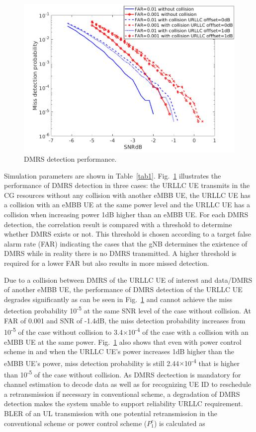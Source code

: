 \documentclass{report}
\begin{document}
\begin{figure}[htbp]
\centerline{\includegraphics[scale=0.33]{fig10.png}}
\caption{DMRS detection performance.}
\label{fig10}
\end{figure}

Simulation parameters are shown in Table~\ref{tab1}. Fig.~\ref{fig10} illustrates the performance of DMRS detection in three cases: the URLLC UE transmits in the CG resources without any collision with another eMBB UE, the URLLC UE has a collision with an eMBB UE at the same power level and the URLLC UE has a collision when increasing power 1dB higher than an eMBB UE. For each DMRS detection, the correlation result is compared with a threshold to determine whether DMRS exists or not. This threshold is chosen according to a target false alarm rate (FAR) indicating the cases that the gNB determines the existence of DMRS while in reality there is no DMRS transmitted. A higher threshold is required for a lower FAR but also results in more missed detection.

Due to a collision between DMRS of the URLLC UE of interest and data/DMRS of another eMBB UE, the performance of DMRS detection of the URLLC UE degrades significantly as can be seen in Fig.~\ref{fig10} and cannot achieve the miss detection probability 10\textsuperscript{-5} at the same SNR level of the case without collision. At FAR of 0.001 and SNR of -1.4dB, the miss detection probability increases from 10\textsuperscript{-5} of the case without collision to 3.4$\times$10\textsuperscript{-4} of the case with a collision with an eMBB UE at the same power. Fig.~\ref{fig10} also shows that even with power control scheme in \cite{ad4} and \cite{ad5} when the URLLC UE's power increases 1dB higher than the eMBB UE's power, miss detection probability is still 2.44$\times$10\textsuperscript{-4} that is higher than 10\textsuperscript{-5} of the case without collision. As DMRS dectection is mandatory for channel estimation to decode data as well as for recognizing UE ID to reschedule a retransmission if necessary in conventional scheme, a degradation of DMRS detection makes the system unable to support reliability URLLC requirement. BLER of an UL transmission with one potential retransmission in the conventional scheme or power control scheme ($ P^{e}_{1}$) is calculated as\useshortskip
\end{document}
